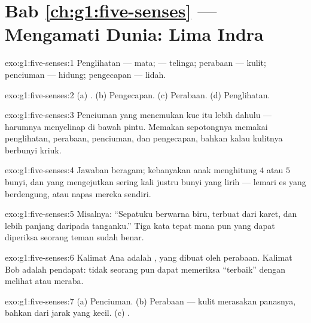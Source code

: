 \section*{Bab \ref{ch:g1:five-senses} --- Mengamati Dunia: Lima Indra}

\begin{solution}{exo:g1:five-senses:1}
Penglihatan --- mata;  --- telinga; perabaan --- kulit;
penciuman --- hidung; pengecapan --- lidah.
\end{solution}

\begin{solution}{exo:g1:five-senses:2}
(a) . (b) Pengecapan. (c) Perabaan. (d) Penglihatan.
\end{solution}

\begin{solution}{exo:g1:five-senses:3}
Penciuman yang menemukan kue itu lebih dahulu --- harumnya menyelinap
di bawah pintu. Memakan sepotongnya memakai penglihatan, perabaan,
penciuman, dan pengecapan, bahkan  kalau kulitnya berbunyi
kriuk.
\end{solution}

\begin{solution}{exo:g1:five-senses:4}
Jawaban beragam; kebanyakan anak menghitung $4$ atau $5$ bunyi, dan
yang mengejutkan sering kali justru bunyi yang lirih --- lemari es
yang berdengung, atau napas mereka sendiri.
\end{solution}

\begin{solution}{exo:g1:five-senses:5}
Misalnya: ``Sepatuku berwarna biru, terbuat dari karet, dan lebih
panjang daripada tanganku.'' Tiga kata tepat mana pun yang dapat
diperiksa seorang teman sudah benar.
\end{solution}

\begin{solution}{exo:g1:five-senses:6}
Kalimat Ana adalah , yang dibuat oleh perabaan. Kalimat Bob
adalah pendapat: tidak seorang pun dapat memeriksa ``terbaik'' dengan
melihat atau meraba.
\end{solution}

\begin{solution}{exo:g1:five-senses:7}
(a) Penciuman. (b) Perabaan --- kulit merasakan panasnya, bahkan dari
jarak yang kecil. (c) .
\end{solution}

